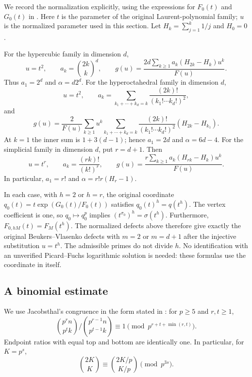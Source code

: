 \documentclass[11pt,a4paper]{article}
\theoremstyle{definition}\newtheorem{definition}[theorem]{Definition}
\theoremstyle{remark}\newtheorem{remark}[theorem]{Remark}
\numberwithin{equation}{section}
\begin{document}
We record the normalization explicitly, using the expressions for
$F_0(t)$ and $G_0(t)$ in \cite[\S7, Proposition~9.1]{BV3}.
Here $t$ is the parameter of the original Laurent-polynomial family;
$u$ is the normalized parameter used in this section.  Let
$H_k=\sum_{j=1}^k1/j$ and $H_0=0$.

For the hypercubic family in dimension $d$,
\[
 u=t^2,\qquad a_k=\binom{2k}{k}^d,\qquad
 g(u)=\frac{2d\sum_{k\geq1}a_k(H_{2k}-H_k)u^k}{F(u)}.
\]
Thus $a_1=2^d$ and $\alpha=d2^d$.
For the hyperoctahedral family in dimension $d$,
\[
 u=t^2,\qquad
 a_k=\sum_{k_1+\cdots+k_d=k}\frac{(2k)!}{(k_1!\cdots k_d!)^2},
\]
and
\[
 g(u)=\frac{2}{F(u)}\sum_{k\geq1}u^k
 \sum_{k_1+\cdots+k_d=k}
 \frac{(2k)!}{(k_1!\cdots k_d!)^2}(H_{2k}-H_{k_1}).
\]
At $k=1$ the inner sum is $1+3(d-1)$; hence
$a_1=2d$ and $\alpha=6d-4$.
For the simplicial family in dimension $d$, put $r=d+1$.  Then
\[
 u=t^r,\qquad a_k=\frac{(rk)!}{(k!)^r},\qquad
 g(u)=\frac{r\sum_{k\geq1}a_k(H_{rk}-H_k)u^k}{F(u)}.
\]
In particular, $a_1=r!$ and $\alpha=r!r(H_r-1)$.

In each case, with $h=2$ or $h=r$, the original coordinate
$q_0(t)=t\exp(G_0(t)/F_0(t))$ satisfies
$q_0(t)^h=q(t^h)$.  The vertex coefficient is one, so
$q_0\mapsto q_0^p$ implies $(t^{\sigma_0})^h=\sigma(t^h)$.
Furthermore, $F_{0,hM}(t)=F_M(t^h)$.  The normalized defects above
therefore give exactly the original Beukers--Vlasenko defects with
$m=2$ or $m=d+1$ after the injective substitution $u=t^h$.
The admissible primes do not divide $h$.
No identification with an unverified Picard--Fuchs logarithmic
solution is needed: these formulas use the coordinate in
\cite[Definition~7.14]{BV3} itself.

\subsection{A binomial estimate}

We use Jacobsthal's congruence in the form stated in
\cite[Lemma~2.1, equation~(7)]{St23}: for $p\geq5$ and $r,t\geq1$,
\begin{equation}\label{E:eq:sh-jacobsthal}
 \binom{p^rn}{p^tk}\bigg/\binom{p^{r-1}n}{p^{t-1}k}
 \equiv1\pmod{p^{r+t+\min(r,t)}}.
\end{equation}
Endpoint ratios with equal top and bottom are identically one.
In particular, for $K=p^s$,
\begin{equation}\label{E:eq:sh-central}
 \binom{2K}{K}\equiv\binom{2K/p}{K/p}\pmod{p^{3s}}.
\end{equation}
\end{document}
